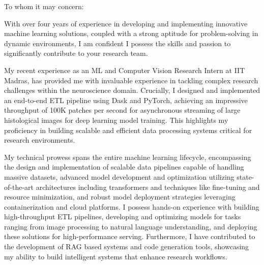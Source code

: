 \documentclass{ExpressiveCoverLetter}
\begin{document}
\coverletterheader[
	firstname=Risan Raja,
	middleinitial=,
	lastname=,
	email=risan.raja@icloud.com,
	linkedin=risanraja,
	github=risan-raja,
]

\vspace{0.15in}

To whom it may concern:

With over four years of experience in developing and implementing
innovative machine learning solutions, coupled with a strong aptitude 
for problem-solving in dynamic environments, I am confident I possess 
the skills and passion to significantly contribute to your research team.

My recent experience as an ML and Computer Vision Research Intern at IIT Madras, has provided me 
 with invaluable experience in tackling complex research challenges 
 within the neuroscience domain. Crucially, I designed and implemented an end-to-end ETL 
 pipeline using Dask and PyTorch, achieving an impressive throughput of 
 100K patches per second for asynchronous streaming of large
 histological images for deep learning model training. This highlights 
 my proficiency in building scalable and efficient data processing
 systems critical for research environments.

 My technical prowess spans the entire machine learning lifecycle, 
 encompassing the design and implementation of scalable data pipelines 
 capable of handling massive datasets, advanced model development and 
 optimization utilizing state-of-the-art architectures including 
 transformers and techniques like fine-tuning and resource minimization, 
 and robust model deployment strategies leveraging containerization and 
 cloud platforms. I possess hands-on experience with building
 high-throughput ETL pipelines, developing and optimizing models for 
 tasks ranging from image processing to natural language understanding, 
 and deploying these solutions for high-performance serving.
 Furthermore, I have contributed to the development of RAG based systems 
 and code generation tools, showcasing my ability to build intelligent
 systems that enhance research workflows.
\end{document}
